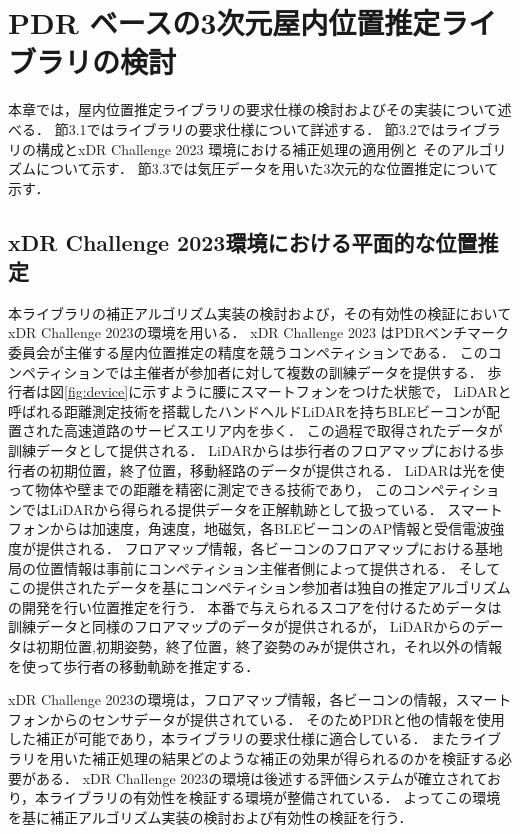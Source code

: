 
\chapter{PDR ベースの3次元屋内位置推定ライブラリの検討}
\thispagestyle{myheadings}
本章では，屋内位置推定ライブラリの要求仕様の検討およびその実装について述べる．
節3.1ではライブラリの要求仕様について詳述する．
節3.2ではライブラリの構成とxDR Challenge 2023 環境における補正処理の適用例と
そのアルゴリズムについて示す．
節3.3では気圧データを用いた3次元的な位置推定について示す．




\section{xDR Challenge 2023環境における平面的な位置推定}

本ライブラリの補正アルゴリズム実装の検討および，その有効性の検証においてxDR Challenge 2023\cite{xdr}の環境を用いる．
xDR Challenge 2023 はPDRベンチマーク委員会が主催する屋内位置推定の精度を競うコンペティションである．
このコンペティションでは主催者が参加者に対して複数の訓練データを提供する．
歩行者は図\ref{fig:device}に示すように腰にスマートフォンをつけた状態で，
LiDARと呼ばれる距離測定技術を搭載したハンドヘルドLiDARを持ちBLEビーコンが配置された高速道路のサービスエリア内を歩く．
この過程で取得されたデータが訓練データとして提供される．
LiDARからは歩行者のフロアマップにおける歩行者の初期位置，終了位置，移動経路のデータが提供される．
LiDARは光を使って物体や壁までの距離を精密に測定できる技術であり，
このコンペティションではLiDARから得られる提供データを正解軌跡として扱っている．
スマートフォンからは加速度，角速度，地磁気，各BLEビーコンのAP情報と受信電波強度が提供される．
フロアマップ情報，各ビーコンのフロアマップにおける基地局の位置情報は事前にコンペティション主催者側によって提供される．
そしてこの提供されたデータを基にコンペティション参加者は独自の推定アルゴリズムの開発を行い位置推定を行う．
本番で与えられるスコアを付けるためデータは訓練データと同様のフロアマップのデータが提供されるが，
LiDARからのデータは初期位置,初期姿勢，終了位置，終了姿勢のみが提供され，それ以外の情報を使って歩行者の移動軌跡を推定する．

xDR Challenge 2023の環境は，フロアマップ情報，各ビーコンの情報，スマートフォンからのセンサデータが提供されている．
そのためPDRと他の情報を使用した補正が可能であり，本ライブラリの要求仕様に適合している．
またライブラリを用いた補正処理の結果どのような補正の効果が得られるのかを検証する必要がある．
xDR Challenge 2023の環境は後述する評価システムが確立されており，本ライブラリの有効性を検証する環境が整備されている．
よってこの環境を基に補正アルゴリズム実装の検討および有効性の検証を行う．

